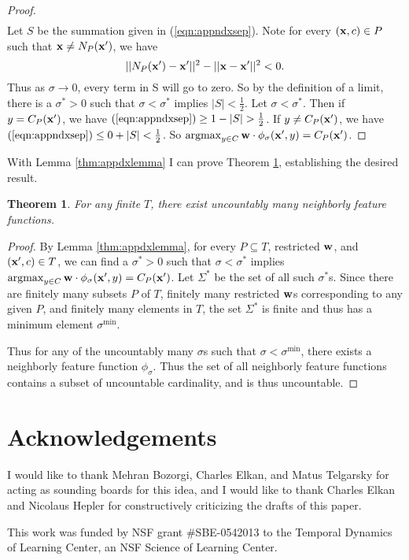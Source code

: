 \documentclass[preprint]{elsarticle}
\newcommand{\argmax}{\operatornamewithlimits{argmax}}
\newtheorem{theorem}{Theorem}
\begin{document}
\begin{proof}
\begin{align}
\end{align}
Let $S$ be the summation given in (\ref{eqn:appndxsep}). Note for every $({\bf x},c) \in P$ such that ${\bf x} \neq N_P({\bf x}')$, we have
\[
||N_P({\bf x}') - {\bf x'} ||^2 - ||{\bf x} - {\bf x'} ||^2 < 0.
\]
Thus as $\sigma \rightarrow 0$, every term in S will go to zero. So by the definition of a limit, there is a $\sigma^* > 0$ such that $\sigma < \sigma^*$ implies $|S| < \frac{1}{2}$. Let $\sigma < \sigma^*$. Then if $y = C_P({\bf x}')$, we have $(\ref{eqn:appndxsep}) \geq 1 - |S| > \frac{1}{2}$. If $y \neq C_P({\bf x}')$, we have $(\ref{eqn:appndxsep}) \leq 0 + |S| < \frac{1}{2}$. So $\argmax_{y \in C} {\bf w} \cdot \phi_\sigma({\bf x}',y) = C_P({\bf x}')$.
\end{proof}

With Lemma \ref{thm:appdxlemma} I can prove Theorem \ref{thm:appdxthm}, establishing the desired result.

\begin{theorem}
\label{thm:appdxthm}
For any finite $T$, there exist uncountably many neighborly feature functions.
\end{theorem}
\begin{proof}
By Lemma \ref{thm:appdxlemma}, for every $P \subseteq T$, restricted ${\bf w}$, and $({\bf x}',c) \in T$, we can find a $\sigma^*>0$ such that $\sigma < \sigma^*$ implies $\argmax_{y \in C} {\bf w} \cdot \phi_\sigma({\bf x}',y) = C_P({\bf x}')$. Let $\Sigma^*$ be the set of all such $\sigma^*$s. Since there are finitely many subsets $P$ of $T$, finitely many restricted ${\bf w}$s corresponding to any given $P$, and finitely many elements in $T$, the set $\Sigma^*$ is finite and thus has a minimum element $\sigma^{\text{min}}$. 

Thus for any of the uncountably many $\sigma$s such that $\sigma < \sigma^{\text{min}}$, there exists a neighborly feature function $\phi_\sigma$. Thus the set of all neighborly feature functions contains a subset of uncountable cardinality, and is thus uncountable.
\end{proof}

\section*{Acknowledgements}

I would like to thank Mehran Bozorgi, Charles Elkan, and Matus Telgarsky for acting as sounding boards for this idea, and I would like to thank Charles Elkan and Nicolaus Hepler for constructively criticizing the drafts of this paper.

This work was funded by NSF grant \#SBE-0542013 to the Temporal Dynamics of Learning Center, an NSF Science of Learning Center.



\end{document}
